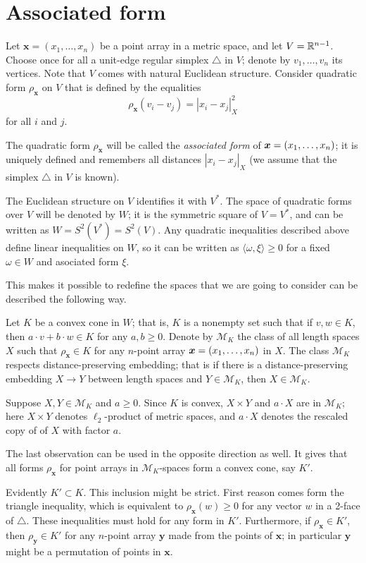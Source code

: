 \documentclass[a4paper,10pt]{article}
\begin{document}
\section{Associated form}\label{Associated form}
Let $\bm{x}=(x_1,\dots,x_n)$ be a point array in a metric space, and let $V\z=\RR^{n-1}$.
Choose once for all a unit-edge regular simplex $\triangle$ in $V$; denote by $v_1,\dots,v_n$ its vertices.
Note that $V$ comes with natural Euclidean structure.
Consider quadratic form $\rho_{\bm{x}}$ on $V$ that is defined by the equalities
\[\rho_{\bm{x}}(v_i-v_j)=|x_i-x_j|^2_X\] 
for all $i$ and $j$.

The quadratic form $\rho_{\bm{x}}$ will be called the \emph{associated form} of $\bm{x}=(x_1,\z\dots,x_n)$;
it is uniquely defined and remembers all distances $|x_i-x_j|_X$
(we assume that the simplex $\triangle$ in $V$ is known).

The Euclidean structure on $V$ identifies it with $V^*$.
The space of quadratic forms over $V$ will be denoted by $W$;
it is the symmetric square of $V=V^*$, and can be written as $W=S^2(V^*)=S^2(V)$.
Any quadratic inequalities described above define linear inequalities on $W$, so it can be written as $\langle\omega,\xi\rangle\ge 0$ for a fixed $\omega\in W$ and asociated form $\xi$.

This makes it possible to redefine the spaces that we are going to consider can be described the following way.

Let $K$ be a convex cone in $W$;
that is, $K$ is a nonempty set such that if $v,w\in K$, then $a\cdot v+b\cdot w\in K$ for any $a,b\ge0$.
Denote by $\mathcal{M}_K$ the class of all length spaces $X$ such that
$\rho_{\bm{x}}\in K$ for any $n$-point array $\bm{x}\z=(x_1,\dots,x_n)$ in $X$.
The class $\mathcal{M}_K$ respects distance-preserving embedding; that is
if there is a distance-preserving embedding $X\to Y$ between length spaces and $Y \in  \mathcal{M}_K$, then $X\in \mathcal{M}_K$.

Suppose $X,Y\in  \mathcal{M}_K$ and $a\ge 0$.
Since $K$ is convex,  $X\times Y$ and $a\cdot X$ are in $\mathcal{M}_K$;
here $X\times Y$ denotes $\ell_2$-product of metric spaces, and 
$a\cdot X$ denotes the rescaled copy of of $X$ with factor $a$. 

The last observation can be used in the opposite direction as well.
It gives that all forms $\rho_{\bm{x}}$ for point arrays in $\mathcal{M}_K$-spaces form a convex cone, say $K'$.

Evidently $K'\subset K$.
This inclusion might be strict.
First reason comes form the triangle inequality, which is equivalent to $\rho_{\bm{x}}(w)\ge 0$ for any vector $w$ in a 2-face of $\triangle$.
These inequalities must hold for any form in $K'$.
Furthermore, if $\rho_{\bm{x}}\in K'$, then $\rho_{\bm{y}}\in K'$ for any $n$-point array $\bm{y}$ made from the points of $\bm{x}$; in particular $\bm{y}$ might be a permutation of points in $\bm{x}$.
\end{document}
